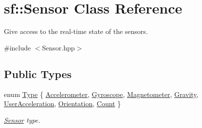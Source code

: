 \hypertarget{classsf_1_1_sensor}{}\section{sf\+:\+:Sensor Class Reference}
\label{classsf_1_1_sensor}


Give access to the real-\/time state of the sensors.  




{\ttfamily \#include $<$Sensor.\+hpp$>$}

\subsection*{Public Types}
\begin{DoxyCompactItemize}
\item 
enum \mbox{\hyperlink{classsf_1_1_sensor_a687375af3ab77b818fca73735bcaea84}{Type}} \{ \newline
\mbox{\hyperlink{classsf_1_1_sensor_a687375af3ab77b818fca73735bcaea84a11bc58199593e217de23641755ecc867}{Accelerometer}}, 
\mbox{\hyperlink{classsf_1_1_sensor_a687375af3ab77b818fca73735bcaea84a1c43984aacd29b1fda5356883fb19656}{Gyroscope}}, 
\mbox{\hyperlink{classsf_1_1_sensor_a687375af3ab77b818fca73735bcaea84ae706bb678bde8d3c370e246ffde6a63d}{Magnetometer}}, 
\mbox{\hyperlink{classsf_1_1_sensor_a687375af3ab77b818fca73735bcaea84afab4d098cc64e791a0c4a9ef6b32db92}{Gravity}}, 
\newline
\mbox{\hyperlink{classsf_1_1_sensor_a687375af3ab77b818fca73735bcaea84ad3a399e0025892b7c53e8767cebb9215}{User\+Acceleration}}, 
\mbox{\hyperlink{classsf_1_1_sensor_a687375af3ab77b818fca73735bcaea84aa428c5260446555de87c69b65f6edf00}{Orientation}}, 
\mbox{\hyperlink{classsf_1_1_sensor_a687375af3ab77b818fca73735bcaea84afcb4a80eb9e3f927c5837207a1b9eb29}{Count}}
 \}
\begin{DoxyCompactList}\small\item\em \mbox{\hyperlink{classsf_1_1_sensor}{Sensor}} type. \end{DoxyCompactList}\end{DoxyCompactItemize}
